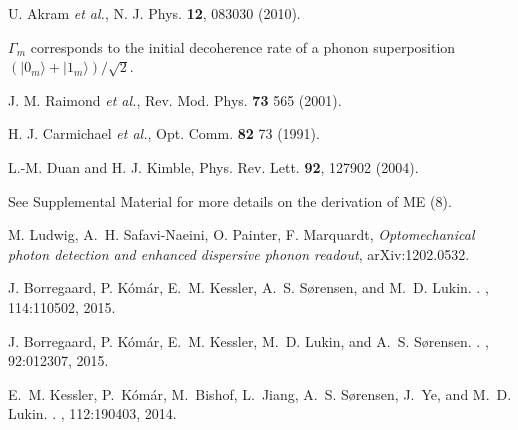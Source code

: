 \begin{thebibliography}{1}
U. Akram {\it et al.}, 
N. J. Phys. {\bf 12}, 083030 (2010). 

$\Gamma_m$ corresponds to the initial decoherence rate of a phonon superposition
$(|0_m\rangle+|1_m\rangle)/\sqrt{2}$.

J. M. Raimond {\it et al.}, 
Rev. Mod. Phys. {\bf 73} 565 (2001). 

H. J. Carmichael {\it et al.}, 
Opt. Comm. {\bf 82} 73 (1991). 

L.-M. Duan and H. J. Kimble,  
Phys. Rev. Lett. {\bf 92}, 127902 (2004). 

See Supplemental Material for more details on the derivation of ME (8).


M. Ludwig, 
A.~H. Safavi-Naeini, 
O. Painter, 
F. Marquardt, 
{\it Optomechanical photon
detection and enhanced dispersive phonon readout}, 
arXiv:1202.0532.



J. Borregaard, 
P. K\'{o}m\'{a}r, 
E.~M. Kessler, 
A.~S. S{\o}rensen, 
and M.~D. Lukin.
.
, 
114:110502, 2015.


J. Borregaard, 
P. K\'{o}m\'{a}r, 
E.~M. Kessler, 
M.~D. Lukin, 
and A.~S. S{\o}rensen.
.
, 
92:012307, 2015.


E.~M. Kessler, 
P.~K\'{o}m\'{a}r, 
M.~Bishof, 
L.~Jiang, 
A.~S. S{\o}rensen, 
J.~Ye,
and M.~D. Lukin.
.
, 
112:190403, 2014.


\end{thebibliography}
